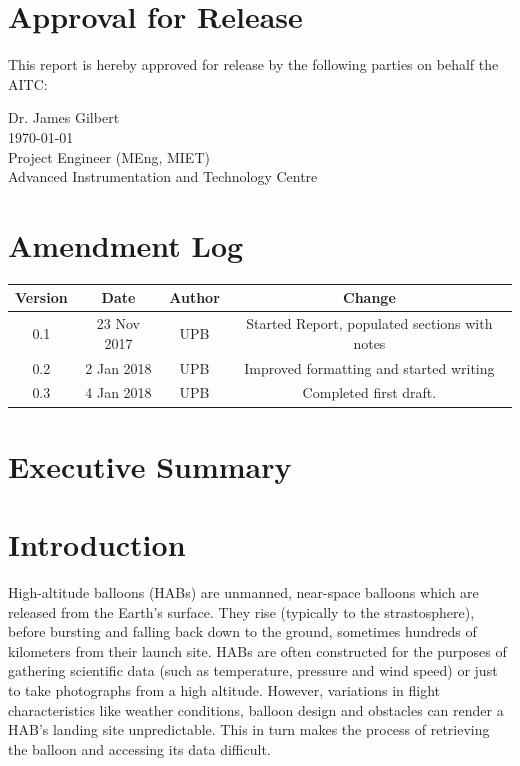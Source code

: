 \documentclass[11pt]{article}
\begin{document}
\newpage

\bigskip
\section{Approval for Release}
This report is hereby approved for release by the following parties on behalf the AITC: \\

\bigskip
\bigskip

\begin{center}
Dr. James Gilbert \\
\today \\
Project Engineer (MEng, MIET) \\
Advanced Instrumentation and Technology Centre
\end{center}


\newpage
\section{Amendment Log}

\begin{table}[!h] \centering
 \begin{tabular}{|c c c c|} 
 \hline
 Version & Date & Author & Change \\ [0.5ex] 
 \hline
 0.1 & 23 Nov 2017 & UPB & Started Report, populated sections with notes \\
 \hline
  0.2 & 2 Jan 2018 & UPB & Improved formatting and started writing \\
 \hline
   0.3 & 4 Jan 2018 & UPB & Completed first draft. \\
 \hline
\end{tabular}
\end{table}

\newpage

\section{Executive Summary}

\newpage

\tableofcontents

\listoffigures

\listoftables

\newpage

\section{Introduction}

High-altitude balloons (HABs) are unmanned, near-space balloons which are released from the Earth's surface. They rise (typically to the strastosphere), before bursting and falling back down to the ground, sometimes hundreds of kilometers from their launch site. HABs are often constructed for the purposes of gathering scientific data (such as temperature, pressure and wind speed) or just to take photographs from a high altitude. However, variations in flight characteristics like weather conditions, balloon design and obstacles can render a HAB's landing site unpredictable. This in turn makes the process of retrieving the balloon and accessing its data difficult. \\
\end{document}

